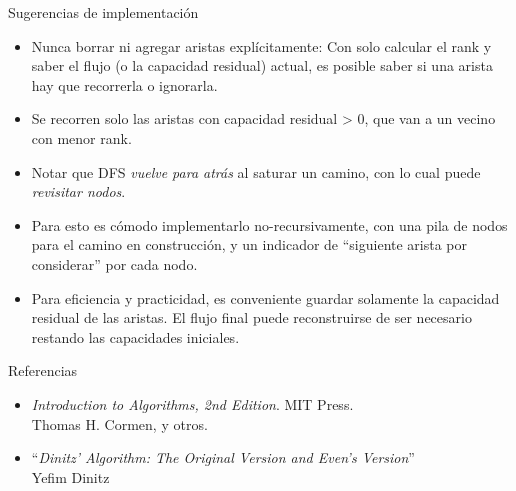 \documentclass{beamer}
\begin{document}
\begin{frame}{Sugerencias de implementación}
    \begin{itemize}
        \item Nunca borrar ni agregar aristas explícitamente: Con solo calcular el rank y saber el flujo (o la capacidad residual) actual, es posible saber si una arista hay que recorrerla o ignorarla.
        \item Se recorren solo las aristas con capacidad residual > 0, que van a un vecino con menor rank.
        \item Notar que DFS \textit{vuelve para atrás} al saturar un camino, con lo cual puede \textit{revisitar nodos}.
        \item Para esto es cómodo implementarlo no-recursivamente, con una pila de nodos para el camino en construcción,
                y un indicador de ``siguiente arista por considerar'' por cada nodo.
        \item Para eficiencia y practicidad, es conveniente guardar solamente la capacidad residual de las aristas.
               El flujo final puede reconstruirse de ser necesario restando las capacidades iniciales.
    \end{itemize}
\end{frame}

\begin{frame}{Referencias}
    \begin{itemize}
        \item \textit{Introduction to Algorithms, 2nd Edition}. MIT Press. \\ Thomas H. Cormen, y otros.
        \item ``\textit{Dinitz' Algorithm: The Original Version and Even's Version}'' \\ Yefim Dinitz
    \end{itemize}
\end{frame}
\end{document}
